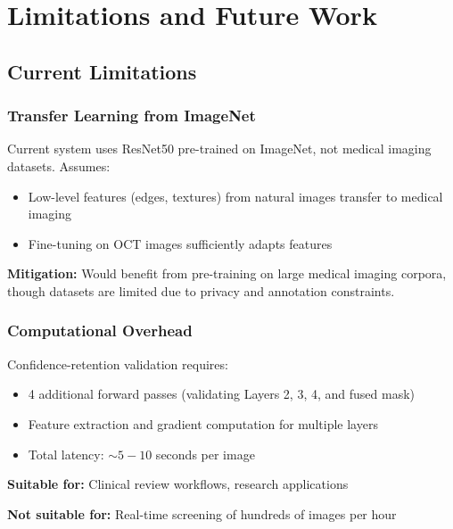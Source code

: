 \documentclass[12pt,a4paper,oneside]{book}
\begin{document}
\chapter{Limitations and Future Work}
\label{ch:limitations}

\section{Current Limitations}

\subsection{Transfer Learning from ImageNet}

Current system uses ResNet50 pre-trained on ImageNet, not medical imaging datasets. Assumes:
\begin{itemize}
  \item Low-level features (edges, textures) from natural images transfer to medical imaging
  \item Fine-tuning on OCT images sufficiently adapts features
\end{itemize}

\textbf{Mitigation:} Would benefit from pre-training on large medical imaging corpora, though datasets are limited due to privacy and annotation constraints.

\subsection{Computational Overhead}

Confidence-retention validation requires:
\begin{itemize}
  \item 4 additional forward passes (validating Layers 2, 3, 4, and fused mask)
  \item Feature extraction and gradient computation for multiple layers
  \item Total latency: $\sim 5-10$ seconds per image
\end{itemize}

\textbf{Suitable for:} Clinical review workflows, research applications

\textbf{Not suitable for:} Real-time screening of hundreds of images per hour
\end{document}
